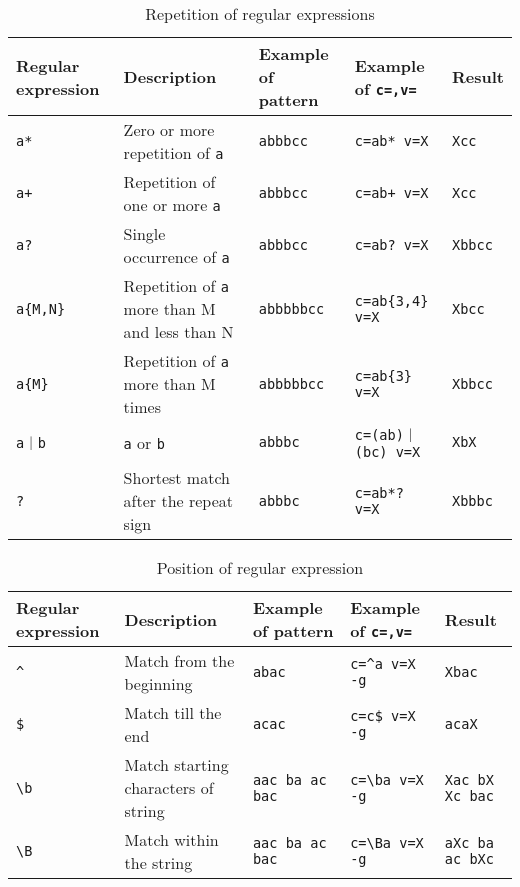 \begin{table}[htbp]
\begin{center}
{\small
\caption{Repetition of regular expressions\label{tbl:msed_regex2}}
\begin{tabular}{l|l|l|l|l}
\hline
Regular expression      & Description                                 & Example of pattern           & Example of \verb|c=,v=|          & Result\\
\hline
\verb|a*|     & Zero or more repetition of \verb|a|          & \verb|abbbcc|   & \verb|c=ab* v=X|        & \verb|Xcc|   \\
\verb|a+|     & Repetition of one or more \verb|a|          & \verb|abbbcc|   & \verb|c=ab+ v=X|        & \verb|Xcc|   \\
\verb|a?|     & Single occurrence of \verb|a|        & \verb|abbbcc|   & \verb|c=ab? v=X|        & \verb|Xbbcc| \\
\verb|a{M,N}| & Repetition of \verb|a| more than M and less than N   & \verb|abbbbbcc| & \verb|c=ab{3,4} v=X|    & \verb|Xbcc|  \\
\verb|a{M}|   & Repetition of \verb|a| more than M times          & \verb|abbbbbcc| & \verb|c=ab{3} v=X|      & \verb|Xbbcc| \\
\verb/a｜b/   & \verb|a| or \verb|b|               & \verb|abbbc|    & \verb/c=(ab)｜(bc) v=X/ & \verb|XbX|   \\
\verb|?|      & Shortest match after the repeat sign & \verb|abbbc|    & \verb|c=ab*? v=X|       & \verb|Xbbbc| \\
\hline
\end{tabular} 
}
\end{center}
\end{table} 

\begin{table}[htbp]
\begin{center}
{\small
\caption{Position of regular expression\label{tbl:msed_regex3}}
\begin{tabular}{l|l|l|l|l}
\hline
Regular expression  & Description                      & Example of pattern                 & Example of \verb|c=,v=|      & Result\\
\hline
\verb|^|  & Match from the beginning          & \verb|abac|          & \verb|c=^a v=X -g|  & \verb|Xbac|\\
\verb|$|  & Match till the end        & \verb|acac|          & \verb|c=c$ v=X -g|  & \verb|acaX|\\
\verb|\b| & Match starting characters of string & \verb|aac ba ac bac| & \verb|c=\ba v=X -g| & \verb|Xac bX Xc bac|\\
\verb|\B| & Match within the string             & \verb|aac ba ac bac| & \verb|c=\Ba v=X -g| & \verb|aXc ba ac bXc|\\
\hline
\end{tabular} 
}
\end{center}
\end{table} 

